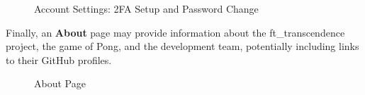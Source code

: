 \begin{figure}[H]
    \caption{Account Settings: 2FA Setup and Password Change}
    \label{fig:settings}
\end{figure}

Finally, an \textbf{About} page may provide information about the ft\_transcendence project, the game of Pong, and the development team, potentially including links to their GitHub profiles.

\begin{figure}[H]
    \caption{About Page}
    \label{fig:about-page}
\end{figure}
